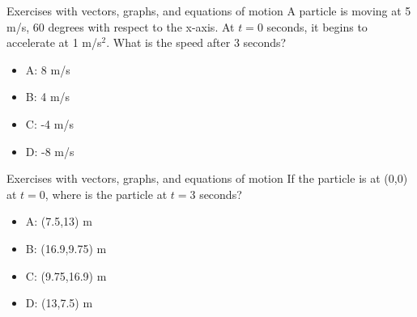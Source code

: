 \documentclass{beamer}
\begin{document}
\begin{frame}{Exercises with vectors, graphs, and equations of motion}
A particle is moving at 5 m/s, 60 degrees with respect to the x-axis.  At $t=0$ seconds, it begins to accelerate at 1 m/s$^2$.  What is the speed after 3 seconds?\\
\begin{itemize}
\item A: 8 m/s
\item B: 4 m/s
\item C: -4 m/s
\item D: -8 m/s 
\end{itemize}
\end{frame}

\begin{frame}{Exercises with vectors, graphs, and equations of motion}
If the particle is at (0,0) at $t=0$, where is the particle at $t=3$ seconds? \\
\begin{itemize}
\item A: (7.5,13) m
\item B: (16.9,9.75) m
\item C: (9.75,16.9) m
\item D: (13,7.5) m 
\end{itemize}
\end{frame}
\end{document}
